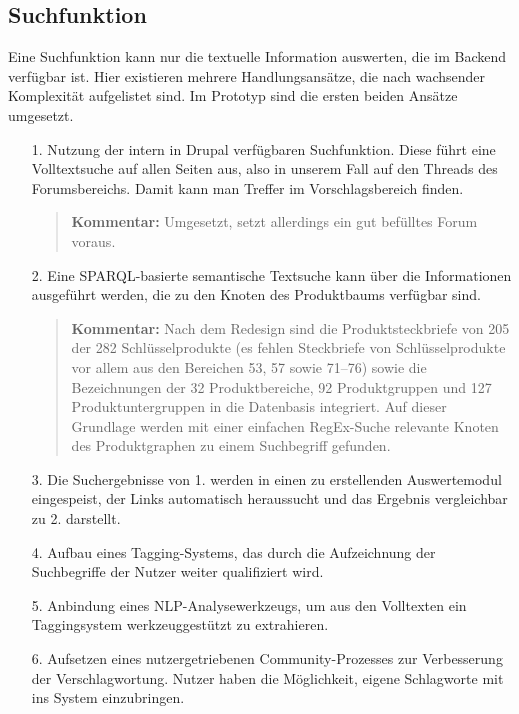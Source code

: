 \documentclass[11pt,a4paper,twoside]{article}
\newcommand{\kommentar}[1]{\begin{quote}\textbf{Kommentar:} #1 \end{quote}}
\begin{document}
\subsection{Suchfunktion}

Eine Suchfunktion kann nur die textuelle Information auswerten, die im Backend
verfügbar ist.  Hier existieren mehrere Handlungsansätze, die nach wachsender
Komplexität aufgelistet sind. Im Prototyp sind die ersten beiden Ansätze
umgesetzt. 
\begin{itemize}\itemsep0pt
\item [1.] Nutzung der intern in Drupal verfügbaren Suchfunktion.  Diese führt
  eine Volltextsuche auf allen Seiten aus, also in unserem Fall auf den Threads
  des Forumsbereichs.  Damit kann man Treffer im Vorschlagsbereich finden.

  \kommentar{Umgesetzt, setzt allerdings ein gut befülltes Forum voraus.}
\item [2.] Eine SPARQL-basierte semantische Textsuche kann über die
  Informationen ausgeführt werden, die zu den Knoten des Produktbaums verfügbar
  sind.

\kommentar{Nach dem Redesign sind die Produktsteckbriefe von 205 der 282
  Schlüsselprodukte (es fehlen Steckbriefe von Schlüsselprodukte vor allem aus
  den Bereichen 53, 57 sowie 71--76) sowie die Bezeichnungen der 32
  Produktbereiche, 92 Produktgruppen und 127 Produktuntergruppen in die
  Datenbasis integriert.  Auf dieser Grundlage werden mit einer einfachen
  RegEx-Suche relevante Knoten des Produktgraphen zu einem Suchbegriff
  gefunden.}

\item [3.] Die Suchergebnisse von 1. werden in einen zu erstellenden
  Auswertemodul eingespeist, der Links automatisch heraussucht und das Ergebnis
  vergleichbar zu 2. darstellt.
\item [4.] Aufbau eines Tagging-Systems, das durch die Aufzeichnung der
  Suchbegriffe der Nutzer weiter qualifiziert wird. 
\item [5.] Anbindung eines NLP-Analysewerkzeugs, um aus den Volltexten ein
  Taggingsystem werkzeuggestützt zu extrahieren.
\item [6.] Aufsetzen eines nutzergetriebenen Community-Prozesses zur
  Verbesserung der Verschlagwortung.  Nutzer haben die Möglichkeit, eigene
  Schlagworte mit ins System einzubringen. 
\end{itemize}
\end{document}
